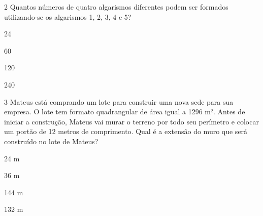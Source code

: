 \num{2} Quantos números de quatro algarismos diferentes podem ser formados
utilizando-se os algarismos 1, 2, 3, 4 e 5?

\begin{escolha}
    \item 24
    \item 60
    \item 120
    \item 240
\end{escolha}



\num{3} Mateus está comprando um lote para construir uma nova sede para sua
empresa. O lote tem formato quadrangular de área igual a 1296 m². Antes
de iniciar a construção, Mateus vai murar o terreno por todo seu
perímetro e colocar um portão de 12 metros de comprimento. Qual é a
extensão do muro que será construído no lote de Mateus?

\begin{escolha}
  \item 24 m
  \item 36 m
  \item 144 m
  \item 132 m
\end{escolha}


